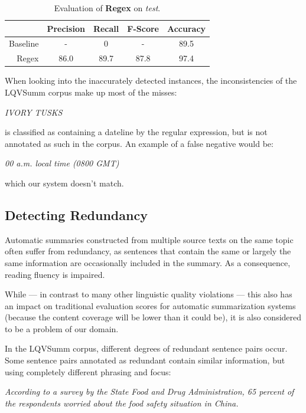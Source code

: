 \documentclass[a4paper,10pt]{scrartcl}
\theoremstyle{style}
\begin{document}
\begin{table}
\begin{center}
\begin{tabular}{|r|c|c|c|c|}
  \hline
  & \textbf{Precision} & \textbf{Recall} & \textbf{F-Score} & \textbf{Accuracy}\\
  \hline
  Baseline & - & 0 & - & 89.5\\
  \hline
  Regex & 86.0 & 89.7 & 87.8 & 97.4\\
  \hline
  \end{tabular}
\end{center}
\caption{Evaluation of \textbf{Regex} on \textit{test}.}
\label{eval_regex}
\end{table}


When looking into the inaccurately detected instances, the inconsistencies of the LQVSumm corpus make up most of the misses:

\textit{IVORY TUSKS}

is classified as containing a dateline by the regular expression, but is not annotated as such in the corpus. An example of a false negative would be:

\textit{00 a.m. local time (0800 GMT)}

which our system doesn't match.

\subsection{Detecting Redundancy}
\label{redundancy}

Automatic summaries constructed from multiple source texts on the same topic often suffer from redundancy, as sentences that contain the same or largely the same information are occasionally included in the summary. As a consequence, reading fluency is impaired.

While --- in contrast to many other linguistic quality violations --- this also has an impact on traditional evaluation scores for automatic summarization systems (because the content coverage will be lower than it could be), it is also considered to be a problem of our domain.

In the LQVSumm corpus, different degrees of redundant sentence pairs occur. Some sentence pairs annotated as redundant contain similar information, but using completely different phrasing and focus:

\textit{According to a survey by the State Food and Drug Administration, 65 percent of the respondents worried about the food safety situation in China.}
\end{document}
